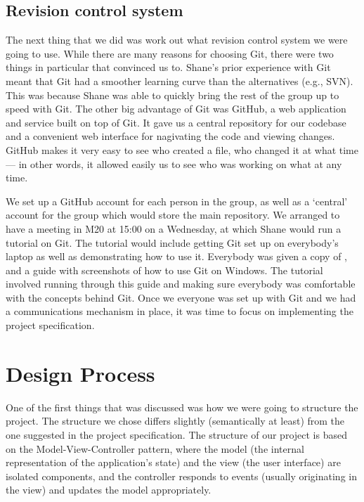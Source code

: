 \subsection{Revision control system}
The next thing that we did was work out what revision control system we were going to use. While there are many reasons for choosing Git\cite{better}, there were two things in particular that convinced us to. Shane's prior experience with Git meant that Git had a smoother learning curve than the alternatives (e.g., SVN). This was because Shane was able to quickly bring the rest of the group up to speed with Git. The other big advantage of Git was GitHub, a web application and service built on top of Git. It gave us a central repository for our codebase and a convenient web interface for nagivating the code and viewing changes. GitHub makes it very easy to see who created a file, who changed it at what time --- in other words, it allowed easily us to see who was working on what at any time.

We set up a GitHub account for each person in the group, as well as a `central' account for the group which would store the main repository.\cite{github} We arranged to have a meeting in M20 at 15:00 on a Wednesday, at which Shane would run a tutorial on Git. The tutorial would include getting Git set up on everybody's laptop as well as demonstrating how to use it. Everybody was given a copy of ,  and a guide with screenshots of how to use Git on Windows\cite{guide}. The tutorial involved running through this guide and making sure everybody was comfortable with the concepts behind Git. Once we everyone was set up with Git and we had a communications mechanism in place, it was time to focus on implementing the project specification.\cite{specification}

\section{Design Process}
One of the first things that was discussed was how we were going to structure the project. The structure we chose differs slightly (semantically at least) from the one suggested in the project specification. The structure of our project is based on the Model-View-Controller\cite{mvc} pattern, where the model (the internal representation of the application's state) and the view (the user interface) are isolated components, and the controller responds to events (usually originating in the view) and updates the model appropriately.


